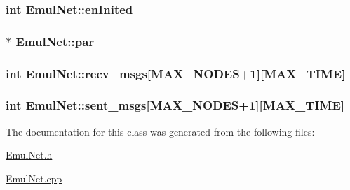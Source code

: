 \subsubsection[{en\+Inited}]{\setlength{\rightskip}{0pt plus 5cm}int Emul\+Net\+::en\+Inited\hspace{0.3cm}{\ttfamily [private]}}\label{class_emul_net_a4138b7caec111f89b7c6795363387c76}
\hypertarget{class_emul_net_ac4bad9fbe60bf590d17341e7d056b478}{}
\subsubsection[{par}]{$\ast$ Emul\+Net\+::par\hspace{0.3cm}{\ttfamily [private]}}\label{class_emul_net_ac4bad9fbe60bf590d17341e7d056b478}
\hypertarget{class_emul_net_ac7bbf4185187eacb894811c1d64e638b}{}
\subsubsection[{recv\+\_\+msgs}]{\setlength{\rightskip}{0pt plus 5cm}int Emul\+Net\+::recv\+\_\+msgs\mbox{[}{\bf M\+A\+X\+\_\+\+N\+O\+D\+E\+S}+1\mbox{]}\mbox{[}{\bf M\+A\+X\+\_\+\+T\+I\+M\+E}\mbox{]}\hspace{0.3cm}{\ttfamily [private]}}\label{class_emul_net_ac7bbf4185187eacb894811c1d64e638b}
\hypertarget{class_emul_net_af2f3873bf04148bfdd8903da1b880734}{}
\subsubsection[{sent\+\_\+msgs}]{\setlength{\rightskip}{0pt plus 5cm}int Emul\+Net\+::sent\+\_\+msgs\mbox{[}{\bf M\+A\+X\+\_\+\+N\+O\+D\+E\+S}+1\mbox{]}\mbox{[}{\bf M\+A\+X\+\_\+\+T\+I\+M\+E}\mbox{]}\hspace{0.3cm}{\ttfamily [private]}}\label{class_emul_net_af2f3873bf04148bfdd8903da1b880734}


The documentation for this class was generated from the following files\+:\begin{DoxyCompactItemize}
\item 
\hyperlink{_emul_net_8h}{Emul\+Net.\+h}\item 
\hyperlink{_emul_net_8cpp}{Emul\+Net.\+cpp}\end{DoxyCompactItemize}
